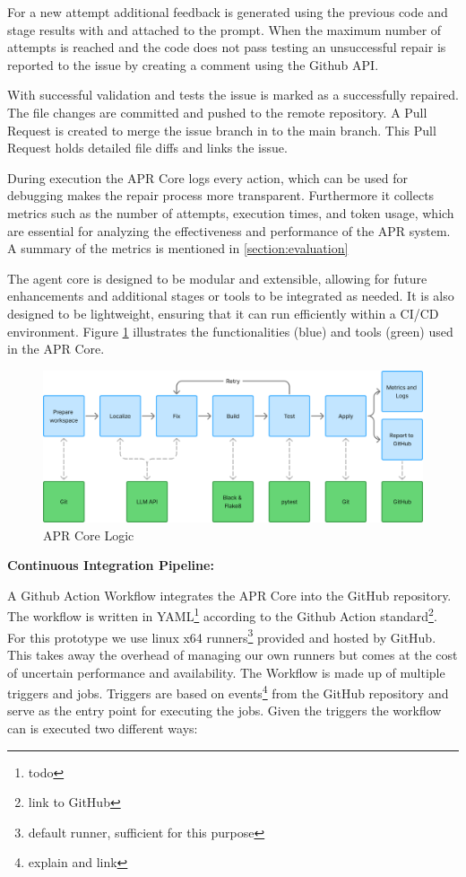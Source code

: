 For a new attempt additional feedback is generated using the previous code and stage results with and attached to the prompt. When the maximum number of attempts is reached and the code does not pass testing an unsuccessful repair is reported to the issue by creating a comment using the Github API.

With successful validation and tests the issue is marked as a successfully repaired. The file changes are committed and pushed to the remote repository. A Pull Request is created to merge the issue branch in to the main branch. This Pull Request holds detailed file diffs and links the issue.

During execution the APR Core logs every action, which can be used for debugging makes the repair process more transparent. Furthermore it collects metrics such as the number of attempts, execution times, and token usage, which are essential for analyzing the effectiveness and performance of the APR system. A summary of the metrics is mentioned in \ref{section:evaluation}

The agent core is designed to be modular and extensible, allowing for future enhancements and additional stages or tools to be integrated as needed. It is also designed to be lightweight, ensuring that it can run efficiently within a CI/CD environment. Figure \ref{fig:apr-core} illustrates the functionalities (blue) and tools (green) used in the APR Core.

\begin{figure}[H]
    \centering
    \includegraphics[width=1\textwidth]{images/flowcharts/apr_core.png}
    \caption{APR Core Logic}
    \label{fig:apr-core}
\end{figure}

\textbf{Continuous Integration Pipeline:}

A Github Action Workflow integrates the APR Core into the GitHub repository. The workflow is written in YAML\footnote{todo} according to the Github Action standard\footnote{link to GitHub}.
For this prototype we use linux x64 runners\footnote{default runner, sufficient for this purpose} provided and hosted by GitHub. This takes away the overhead of managing our own runners but comes at the cost of uncertain performance and availability. %
The Workflow is made up of multiple triggers and jobs. Triggers are based on events\footnote{explain and link} from the GitHub repository and serve as the entry point for executing the jobs. Given the triggers the workflow can is executed two different ways:

